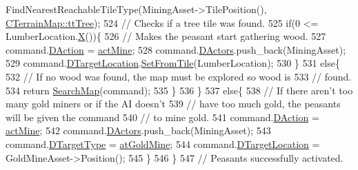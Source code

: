 \begin{DoxyCode}
      FindNearestReachableTileType(MiningAsset->TilePosition(), \hyperlink{classCTerrainMap_aff2ab991e237269941416dd79d8871d4a15600fc22dc08ff5a3aec20930112f8c}{CTerrainMap::ttTree});
524                 \textcolor{comment}{// Checks if a tree tile was found.}
525                 \textcolor{keywordflow}{if}(0 <= LumberLocation.\hyperlink{classCPosition_a9a6b94d3b91df1492d166d9964c865fc}{X}())\{
526                     \textcolor{comment}{// Makes the peasant start gathering wood.}
527                     command.\hyperlink{structSPlayerCommandRequest_a80897bbccf2c4e0b148a7aa815a926c6}{DAction} = \hyperlink{GameDataTypes_8h_a35b98ce26aca678b03c6f9f76e4778cea2e0db284fd05caa56e3867c661ccdd8b}{actMine};
528                     command.\hyperlink{structSPlayerCommandRequest_aa37fc01519676345703d78b9f573894a}{DActors}.push\_back(MiningAsset);
529                     command.\hyperlink{structSPlayerCommandRequest_a701702b94ca2fd2738e95ef6711dd41a}{DTargetLocation}.\hyperlink{classCPosition_a46994e6a8b8e3b4237edd7259ad844b6}{SetFromTile}(LumberLocation);
530                 \}
531                 \textcolor{keywordflow}{else}\{
532                     \textcolor{comment}{// If no wood was found, the map must be explored so wood is}
533                     \textcolor{comment}{// found.}
534                     \textcolor{keywordflow}{return} \hyperlink{classCAIPlayer_afafbe8fc589e09a16ae1f02f2794d7b0}{SearchMap}(command);
535                 \}
536             \}
537             \textcolor{keywordflow}{else}\{
538                 \textcolor{comment}{// If there aren't too many gold miners or if the AI doesn't }
539                 \textcolor{comment}{// have too much gold, the peasants will be given the command}
540                 \textcolor{comment}{// to mine gold.}
541                 command.\hyperlink{structSPlayerCommandRequest_a80897bbccf2c4e0b148a7aa815a926c6}{DAction} = \hyperlink{GameDataTypes_8h_a35b98ce26aca678b03c6f9f76e4778cea2e0db284fd05caa56e3867c661ccdd8b}{actMine};
542                 command.\hyperlink{structSPlayerCommandRequest_aa37fc01519676345703d78b9f573894a}{DActors}.push\_back(MiningAsset);
543                 command.\hyperlink{structSPlayerCommandRequest_a864e47c641127665751091876a6d3c5e}{DTargetType} = \hyperlink{GameDataTypes_8h_a5600d4fc433b83300308921974477feca243d9ba44092eadd561db058d742b3b3}{atGoldMine};
544                 command.\hyperlink{structSPlayerCommandRequest_a701702b94ca2fd2738e95ef6711dd41a}{DTargetLocation} = GoldMineAsset->Position();
545             \}
546         \}
547         \textcolor{comment}{// Peasants successfully activated.}

\end{DoxyCode}
